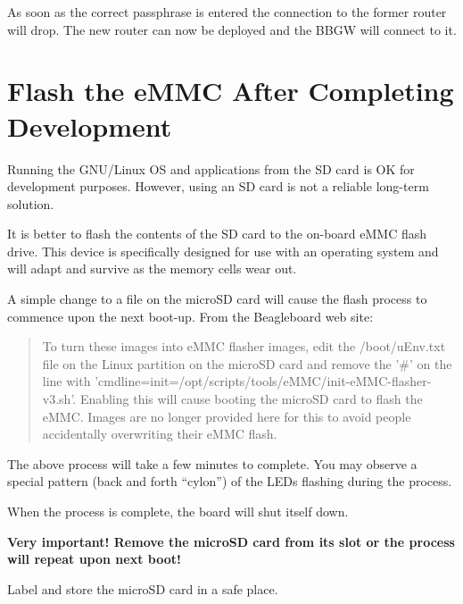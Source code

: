 As soon as the correct passphrase is entered the connection to the former 
router will drop.  The new router can now be deployed and the BBGW will connect 
to it.

\section{Flash the eMMC After Completing Development}

Running the GNU/Linux OS and applications from the SD card is OK for 
development purposes.  However, using an SD card is not a reliable long-term 
solution.

It is better to flash the contents of the SD card to the on-board eMMC flash 
drive.  This device is specifically designed for use with an operating system 
and will adapt and survive as the memory cells wear out.

A simple change to a file on the microSD card will cause the flash process to 
commence upon the next boot-up.  From the Beagleboard web site:

\begin{quotation}
To turn these images into eMMC flasher images, edit the /boot/uEnv.txt file on 
the Linux partition on the microSD card and remove the '\#' on the line with 
'cmdline=init=/opt/scripts/tools/eMMC/init-eMMC-flasher-v3.sh'. Enabling this 
will cause booting the microSD card to flash the eMMC. Images are no longer 
provided here for this to avoid people accidentally overwriting their eMMC 
flash.
\end{quotation}

The above process will take a few minutes to complete.  You may observe a 
special pattern (back and forth ``cylon'') of the LEDs flashing during the 
process.

When the process is complete, the board will shut itself down.

\textbf{Very important!  Remove the microSD card from its slot or the process 
will repeat upon next boot!}

Label and store the microSD card in a safe place.







